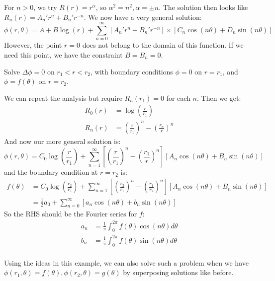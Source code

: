 \documentclass[../Main.tex]{subfiles}
\begin{document}
For $n > 0$, we try $R(r) = r^\alpha$, so $\alpha^2 = n^2, \alpha = \pm n$.
The solution then looks like $R_n(r) = A_n' r^n + B_n' r^{-n}$. We now have a very general solution:
\begin{equation*}
    \phi(r, \theta) = A + B\log(r) + \sum_{n=0}^{\infty} \left[A_n'r^n + B_n' r^{-n}\right] \times \left[C_n \cos(n\theta) + D_n \sin(n\theta)\right]
\end{equation*}
However, the point $r = 0$ does not belong to the domain of this function. If we need this point, we have the constraint $B = B_n = 0$.
\begin{example}
    Solve $\Delta \phi = 0$ on $r_1 < r < r_2$, with boundary conditions $\phi = 0$ on $r = r_1$, and $\phi = f(\theta)$ on $r = r_2$.

    We can repeat the analysis but require $R_n(r_1) = 0$ for each $n$. Then we get:
    \begin{align*}
        R_0(r) &= \log\left(\frac{r}{r_1}\right) \\
        R_n(r) &= \left(\frac{r}{r_1}\right)^n - \left(\frac{r_n}{r}\right)^n
    \end{align*}
    And now our more general solution is:
    \begin{equation*}
        \phi(r, \theta) = C_0\log\left(\frac{r}{r_1}\right) + \sum_{n=1}^{\infty} \left[\left(\frac{r}{r_1}\right)^n - \left(\frac{r_1}{r}\right)^{n}\right]\left[A_n \cos(n\theta) + B_n \sin(n\theta)\right]
    \end{equation*}
    and the boundary condition at $r = r_2$ is:
    \begin{align*}
        f(\theta) &= C_0\log\left(\frac{r_2}{r_1}\right) + \sum_{n=1}^{\infty} \left[\left(\frac{r_2}{r_1}\right)^n - \left(\frac{r_1}{r_2}\right)^{n}\right]\left[A_n \cos(n\theta) + B_n \sin(n\theta)\right] \\
        &= \frac12 a_0 + \sum_{n=0}^{\infty} [a_n \cos(n\theta) + b_n\sin(n\theta)]
    \end{align*}
    So the RHS should be the Fourier series for $f$:
    \begin{align*}
        a_n &= \frac{1}{\pi}\int_{0}^{2\pi} f(\theta) \cos(n\theta) d\theta \\
        b_n &= \frac{1}{\pi}\int_{0}^{2\pi} f(\theta) \sin(n\theta) d\theta \\
    \end{align*}
\end{example}
Using the ideas in this example, we can also solve such a problem when we have $\phi(r_1, \theta) = f(\theta), \phi(r_2, \theta) = g(\theta)$ by superposing solutions like before.
\end{document}
